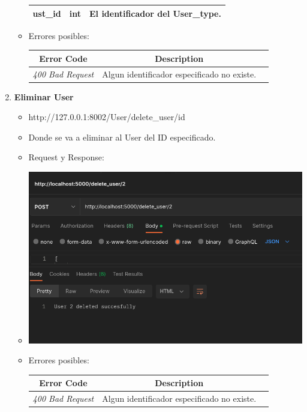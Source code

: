 \documentclass{article}
\begin{document}
\begin{enumerate}
\begin{itemize}
\begin{table}[H]
\begin{tabular}{|l|l|l|}
        ust\_id & int & El identificador del User\_type. \\ \hline \end{tabular}
        \end{table} \item Errores posibles: \begin{table}[H] \centering
        \begin{tabular}{|c|c|l|} \hline \textbf{Error Code} &
        \textbf{Description} \\ \hline \textit{400 Bad Request} & Algun
        identificador especificado no existe. \\ \hline \end{tabular}
        \end{table}
    \end{itemize}

    \item \textbf{Eliminar User}
    \begin{itemize}
        \item http://127.0.0.1:8002/User/delete\_user/id
        \item Donde se va a eliminar al User del ID especificado.
        \item Request y Response:
        \item \includegraphics[scale=.5]{assets/user/delete_user.png}
        \item Errores posibles: \begin{table}[H] \centering
        \begin{tabular}{|c|c|l|} \hline \textbf{Error Code} &
        \textbf{Description} \\ \hline \textit{400 Bad Request} & Algun
        identificador especificado no existe. \\ \hline \end{tabular}
        \end{table}
    \end{itemize}
\end{enumerate}
\end{document}

